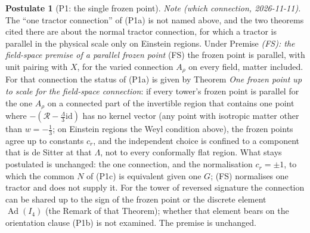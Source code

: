 \documentclass[11pt]{article}
\theoremstyle{definition}
\newtheorem{postulate}[theorem]{Postulate}
\theoremstyle{plain}
\begin{document}
\begin{postulate}[P1: the single frozen point]
\emph{Note (which connection, 2026-11-11).} The ``one tractor connection'' of (P1a) is not named above, and the two theorems cited there are about the normal tractor connection, for which a tractor is parallel in the physical scale only on Einstein regions. Under Premise \emph{(FS): the field-space premise of a parallel frozen point} (FS) the frozen point is parallel, with unit pairing with $X$, for the varied connection $A_{\rho}$ on every field, matter included. For that connection the status of (P1a) is given by Theorem \emph{One frozen point up to scale for the field-space connection}: if every tower's frozen point is parallel for the one $A_{\rho}$ on a connected part of the invertible region that contains one point where $-(\mathcal{R} - \tfrac{\Lambda}{3}\mathrm{id})$ has no kernel vector (any point with isotropic matter other than $w = -\tfrac13$; on Einstein regions the Weyl condition above), the frozen points agree up to constants $c_{r}$, and the independent choice is confined to a component that is de Sitter at that $\Lambda$, not to every conformally flat region. What stays postulated is unchanged: the one connection, and the normalisation $c_{r} = \pm 1$, to which the common $N$ of (P1c) is equivalent given one $G$; (FS) normalises one tractor and does not supply it. For the tower of reversed signature the connection can be shared up to the sign of the frozen point or the discrete element $\operatorname{Ad}(I_{4})$ (the Remark of that Theorem); whether that element bears on the orientation clause (P1b) is not examined. The premise is unchanged.
\end{postulate}
\end{document}
